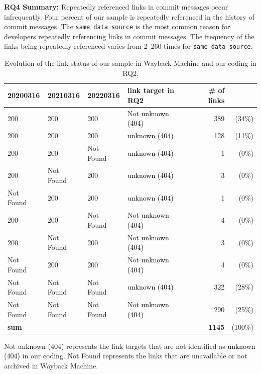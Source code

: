 \documentclass[smallextended]{svjour3}       %
\newcommand{\minor}[1]{\textcolor{black}{#1}}
\begin{document}



\begin{tcolorbox}
\textbf{RQ4 Summary:}
Repeatedly referenced links in commit messages occur infrequently. Four percent of our sample is repeatedly referenced in the history of commit messages. The \texttt{same data source} is the most common reason for developers repeatedly referencing links in commit messages. The frequency of the links being repeatedly referenced varies from 2--260 times for \texttt{same data source}.
\end{tcolorbox}


\begin{table}[t]
\centering
\caption{Evolution of the link status of our sample in Wayback Machine and our coding in RQ2.}
\label{tab:evo}      
\begin{tabular}{llllr@{}r}
\toprule
\textbf{20200316} & \textbf{20210316} & \textbf{20220316} & \textbf{link target in RQ2} &  \textbf{\# of links} \\
\midrule
200 & 200 & 200	& Not \minor{unknown (404)} & 389 & (34\%) \\ 
200 & 200 & 200 & \minor{unknown (404)} & 128 & (11\%) \\
200	& 200 & Not Found & \minor{unknown (404)} & 1 & (0\%) \\
200 & Not Found	& 200 & \minor{unknown (404)}	& 3 & (0\%) \\
Not Found & 200 & 200 & \minor{unknown (404)} & 1 & (0\%) \\
200	& 200 & Not Found & Not \minor{unknown (404)} & 4 & (0\%) \\
200	& Not Found	& 200 & Not \minor{unknown (404)} & 3 & (0\%) \\
Not Found & 200 & 200 & Not \minor{unknown (404)} & 4 & (0\%) \\ 
Not Found & Not Found &Not Found & \minor{unknown (404)} & 322 & (28\%) \\ 
Not Found & Not Found & Not Found & Not \minor{unknown (404)} & 290 & (25\%) \\
\midrule
\textbf{sum} & & & &\textbf{1145} & (100\%)\\
\bottomrule
\end{tabular}
\begin{tablenotes}
      \footnotesize
      \item Not \minor{unknown (404)} represents the link targets that are not identified as \minor{unknown (404)} in our coding. Not Found represents the links that are unavailable or not archived in Wayback Machine.
\end{tablenotes}
\end{table}
\end{document}
